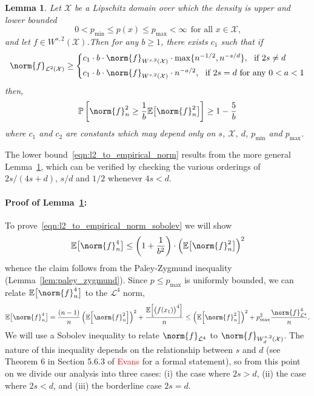 \documentclass{article}
\newcommand{\1}{\mathbf{1}}
\newcommand{\Xset}{\mathcal{X}}
\newcommand{\Leb}{\mathcal{L}}
\newcommand{\Ebb}{\mathbb{E}}
\theoremstyle{alden}
\theoremstyle{aldenthm}
\newtheorem{lemma}{Lemma}
\theoremstyle{definition}
\theoremstyle{remark}
\begin{document}
\begin{lemma}
	\label{lem:empirical_norm_sobolev}
	Let $\Xset$ be a Lipschitz domain over which the density is upper and lower bounded 
	\begin{equation*}
	0 < p_{\min} \leq p(x) \leq p_{\max} < \infty ~~\textrm{for all $x \in \Xset$,}
	\end{equation*}
	and let $f \in W^{s,2}(\Xset)$.Then for any $b \geq 1$, there exists $c_1$ such that if 
	\begin{equation}
	\norm{f}_{\Leb^2(\Xset)} \geq 
	\begin{cases*}
	c_1 \cdot b \cdot \norm{f}_{W^{s,2}(\Xset)} \cdot \max\{n^{-1/2},n^{-s/d}\},~~\textrm{if}~2s \neq d \\
	c_1 \cdot b \cdot \norm{f}_{W^{s,2}(\Xset)} \cdot n^{-a/2},~~\textrm{if}~ 2s = d ~\textrm{for any}~ 0 < a < 1
	\end{cases*}
	\end{equation}
	then,
	\begin{equation}
	\label{eqn:l2_to_empirical_norm_sobolev}
	\mathbb{P}\left[\norm{f}_n^2 \geq \frac{1}{b} \Ebb\bigl[\norm{f}_n^2\bigr]\right] \geq 1 - \frac{5}{b}
	\end{equation}
	where $c_1$ and $c_2$ are constants which may depend only on $s$, $\Xset$, $d$, $p_{\min}$ and $p_{\max}$.
\end{lemma}
The lower bound~\eqref{eqn:l2_to_empirical_norm} results from the more general Lemma~\ref{lem:empirical_norm_sobolev}, which can be verified by checking the various orderings of $2s/(4s + d)$, $s/d$ and $1/2$ whenever $4s < d$. 

\paragraph{Proof of Lemma~\ref{lem:empirical_norm_sobolev}:}

To prove~\eqref{eqn:l2_to_empirical_norm_sobolev} we will show
\begin{equation*}
\mathbb{E}\bigl[\norm{f}_n^4\bigr] \leq \left(1 + \frac{1}{b^2}\right)\cdot \left(\mathbb{E}\bigl[\norm{f}_n^2\bigr]\right)^2
\end{equation*}
whence the claim follows from the Paley-Zygmund inequality (Lemma~\ref{lem:paley_zygmund}). Since $p \leq p_{\max}$ is uniformly bounded, we can relate $\mathbb{E}\bigl[\norm{f}_n^4\bigr]$ to the $\Leb^4$ norm,
\begin{equation*}
\mathbb{E}\bigl[\norm{f}_n^4\bigr] = \frac{(n-1)}{n}\left(\mathbb{E}\Bigl[\norm{f}_n^2\Bigr]\right)^2 + \frac{\mathbb{E}\Bigl[\bigl(f(x_1)\bigr)^4\Bigr]}{n} \leq \left(\mathbb{E}\Bigl[\norm{f}_n^2\Bigr]\right)^2 + p_{\max}^2\frac{\norm{f}_{\Leb^4}^4}{n}.
\end{equation*}
We will use a Sobolev inequality to relate $\norm{f}_{\Leb^4}$ to $\norm{f}_{W_d^{s,2}(\Xset)}$. The nature of this inequality depends on the relationship between $s$ and $d$ (see Theorem 6 in Section 5.6.3 of \textcolor{red}{Evans} for a formal statement), so from this point on we divide our analysis into three cases: (i) the case where $2s > d$, (ii) the case where $2s < d$, and (iii) the borderline case $2s = d$.
\end{document}
